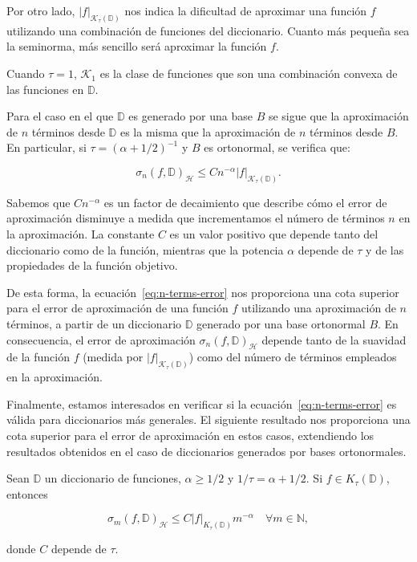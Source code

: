 Por otro lado, $|f|_{\mathcal{K}_{\tau}(\mathbb{D})}$ nos indica la dificultad de aproximar una función $f$ utilizando una combinación de funciones del diccionario. Cuanto más pequeña sea la seminorma, más sencillo será aproximar la función $f$.

\begin{observacion}
    Cuando $\tau = 1$, $\mathcal{K}_1$ es la clase de funciones que son una combinación convexa de las funciones en $\mathbb{D}$.
\end{observacion}

Para el caso en el que $\mathbb{D}$ es generado por una base $B$ se sigue que la aproximación de $n$ términos desde $\mathbb{D}$ es la misma que la aproximación de $n$ términos desde $B$. En particular, si $\tau = (\alpha + 1/2)^{-1}$ y $B$ es ortonormal, se verifica que:

\begin{equation}\label{eq:n-terms-error}
    \sigma_n(f, \mathbb{D})_{\mathcal{H}} \leq Cn^{-\alpha} |f|_{\mathcal{K}_{\tau}(\mathbb{D})}.
\end{equation}

Sabemos que $Cn^{-\alpha}$ es un factor de decaimiento que describe cómo el error de aproximación disminuye a medida que incrementamos el número de términos $n$ en la aproximación. La constante $C$ es un valor positivo que depende tanto del diccionario como de la función, mientras que la potencia $\alpha$ depende de $\tau$ y de las propiedades de la función objetivo.

De esta forma, la ecuación~\eqref{eq:n-terms-error} nos proporciona una cota superior para el error de aproximación de una función $f$ utilizando una aproximación de $n$ términos, a partir de un diccionario $\mathbb{D}$ generado por una base ortonormal $B$. En consecuencia, el error de aproximación $\sigma_n(f, \mathbb{D})_{\mathcal{H}}$ depende tanto de la suavidad de la función $f$ (medida por $|f|_{\mathcal{K}_{\tau}(\mathbb{D})}$) como del número de términos empleados en la aproximación.

Finalmente, estamos interesados en verificar si la ecuación~\eqref{eq:n-terms-error} es válida para diccionarios más generales. El siguiente resultado nos proporciona una cota superior para el error de aproximación en estos casos, extendiendo los resultados obtenidos en el caso de diccionarios generados por bases ortonormales.

\begin{teorema}
    Sean $\mathbb{D}$ un diccionario de funciones, $\alpha \geq 1/2$ y $1/\tau = \alpha + 1/2$. Si $f \in K_{\tau}(\mathbb{D})$, entonces

    \begin{equation}\label{eq:n-terms-teo}
        \sigma_m(f, \mathbb{D})_{\mathcal{H}} \leq C |f|_{K_{\tau}(\mathbb{D})} m^{-\alpha} \quad \forall m \in \mathbb{N},
    \end{equation}

    donde $C$ depende de $\tau$.
\end{teorema}

